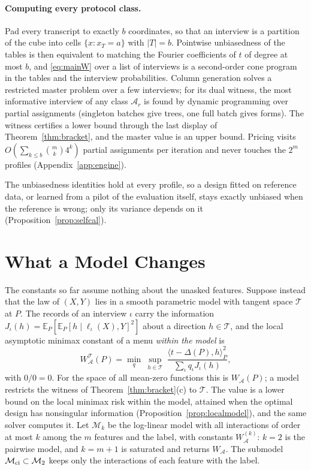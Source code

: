 \documentclass{article}
\newcommand{\E}{\mathbb{E}}
\newcommand{\A}{\mathcal A}
\begin{document}
\paragraph{Computing every protocol class.}
Pad every transcript to exactly $b$ coordinates, so that an interview is a partition of the cube into cells $\{x:x_T=a\}$ with $|T|=b$. Pointwise unbiasedness of the tables is then equivalent to matching the Fourier coefficients of $t$ of degree at most $b$, and \eqref{eq:mainW} over a list of interviews is a second-order cone program in the tables and the interview probabilities. Column generation solves a restricted master problem over a few interviews; for its dual witness, the most informative interview of any class $\A_r$ is found by dynamic programming over partial assignments (singleton batches give trees, one full batch gives forms). The witness certifies a lower bound through the last display of Theorem~\ref{thm:bracket}, and the master value is an upper bound. Pricing visits $O(\sum_{k\le b}\binom mk4^k)$ partial assignments per iteration and never touches the $2^m$ profiles (Appendix~\ref{app:engine}).

The unbiasedness identities hold at every profile, so a design fitted on reference data, or learned from a pilot of the evaluation itself, stays exactly unbiased when the reference is wrong; only its variance depends on it (Proposition~\ref{prop:selfcal}).

\section{What a Model Changes}\label{sec:model}
The constants so far assume nothing about the unasked features. Suppose instead that the law of $(X,Y)$ lies in a smooth parametric model with tangent space $\mathcal T$ at $P$. The records of an interview $\iota$ carry the information $J_\iota(h)=\E_P[\E_P[h\mid\ell_\iota(X),Y]^2]$ about a direction $h\in\mathcal T$, and the local asymptotic minimax constant of a menu \emph{within the model} is
\begin{equation}
 W^{\mathcal T}_\A(P)=\min_q\ \sup_{h\in\mathcal T}\ \frac{\langle t-\Delta(P),h\rangle_P^2}{\sum_\iota q_\iota J_\iota(h)},\label{eq:mainWT}
\end{equation}
with $0/0=0$. For the space of all mean-zero functions this is $W_\A(P)$; a model restricts the witness of Theorem~\ref{thm:bracket}(c) to $\mathcal T$. The value is a lower bound on the local minimax risk within the model, attained when the optimal design has nonsingular information (Proposition~\ref{prop:localmodel}), and the same solver computes it. Let $\mathcal M_k$ be the log-linear model with all interactions of order at most $k$ among the $m$ features and the label, with constants $W^{(k)}_\A$: $k=2$ is the pairwise model, and $k=m+1$ is saturated and returns $W_\A$. The submodel $\mathcal M_{\rm ci}\subset\mathcal M_2$ keeps only the interactions of each feature with the label.
\end{document}
